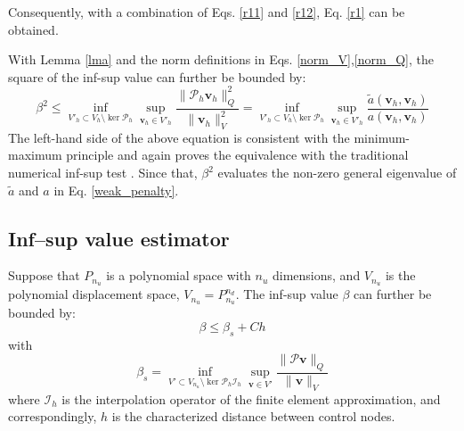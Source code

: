 \begin{pf}
Consequently, with a combination of Eqs. \eqref{r11} and \eqref{r12}, Eq. \eqref{r1} can be obtained.
\end{pf}

\begin{rmk}
With Lemma \ref{lma} and the norm definitions in Eqs. \eqref{norm_V},\eqref{norm_Q}, the square of the inf-sup value can further be bounded by:
\begin{equation}
\beta^2 \le \inf_{V'_h \subset V_h \setminus \ker \mathcal{P}_h} \sup_{\boldsymbol{v}_h \in V'_h} \frac{\|\mathcal{P}_h \boldsymbol{v}_h\|_Q^2}{\|\boldsymbol{v}_h\|_V^2} = \inf_{V'_h \subset V_h \setminus \ker \mathcal{P}_h} \sup_{\boldsymbol{v}_h \in V'_h} \frac{\tilde{a}(\boldsymbol{v}_h, \boldsymbol{v}_h)}{a(\boldsymbol{v}_h, \boldsymbol{v}_h)}
\end{equation}
The left-hand side of the above equation is consistent with the minimum-maximum principle \cite{babuska1991a} and again proves the equivalence with the traditional numerical inf-sup test \cite{malkus1981}. Since that, $\beta^2$ evaluates the non-zero general eigenvalue of $\tilde{a}$ and $a$ in Eq. \eqref{weak_penalty}.
\end{rmk}

\subsection{Inf--sup value estimator}

\begin{thm}
Suppose that $P_{n_u}$ is a polynomial space with $n_u$ dimensions, and $V_{n_u}$ is the polynomial displacement space, $V_{n_u} = P_{n_u}^{n_d}$. The inf-sup value $\beta$ can further be bounded by:
\begin{equation}\label{estimator}
\beta \le \beta_s + Ch
\end{equation}
with
\begin{equation}\label{beta_s}
\beta_s = \inf_{V' \subset V_{n_u} \setminus \ker \mathcal{P}_h \mathcal{I}_h} \sup_{\boldsymbol{v} \in V'} \frac{\|\mathcal{P} \boldsymbol{v}\|_Q}{\|\boldsymbol{v}\|_V}
\end{equation}
where $\mathcal{I}_h$ is the interpolation operator of the finite element approximation, and correspondingly, $h$ is the characterized distance between control nodes.
\end{thm}

